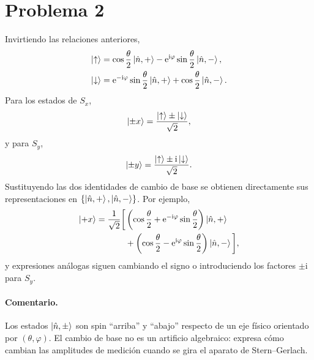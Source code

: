 \documentclass[11pt,a4paper]{article}
\numberwithin{equation}{section}
\newcommand{\ii}{\mathrm i}
\newcommand{\e}{\mathrm e}
\begin{document}
\section{Problema 2}
Invirtiendo las relaciones anteriores,
\begin{align}
\ket\uparrow&=\cos\frac\theta2\ket{\hat n,+}
-\e^{\ii\varphi}\sin\frac\theta2\ket{\hat n,-},\\
\ket\downarrow&=\e^{-\ii\varphi}\sin\frac\theta2\ket{\hat n,+}
+\cos\frac\theta2\ket{\hat n,-}.
\end{align}
Para los estados de $S_x$,
\begin{equation}
\ket{\pm x}=\frac{\ket\uparrow\pm\ket\downarrow}{\sqrt2},
\end{equation}
y para $S_y$,
\begin{equation}
\ket{\pm y}=\frac{\ket\uparrow\pm\ii\ket\downarrow}{\sqrt2}.
\end{equation}
Sustituyendo las dos identidades de cambio de base se obtienen directamente sus representaciones en $\{\ket{\hat n,+},\ket{\hat n,-}\}$. Por ejemplo,
\begin{align}
\ket{+x}=\frac1{\sqrt2}\bigg[&\left(\cos\frac\theta2+\e^{-\ii\varphi}\sin\frac\theta2\right)\ket{\hat n,+}\\
&+\left(\cos\frac\theta2-\e^{\ii\varphi}\sin\frac\theta2\right)\ket{\hat n,-}\bigg],
\end{align}
y expresiones análogas siguen cambiando el signo o introduciendo los factores $\pm\ii$ para $S_y$.

\paragraph{Comentario.}
Los estados $\ket{\hat n,\pm}$ son spin ``arriba'' y ``abajo'' respecto de un eje físico orientado por $(\theta,\varphi)$. El cambio de base no es un artificio algebraico: expresa cómo cambian las amplitudes de medición cuando se gira el aparato de Stern--Gerlach.
\end{document}
